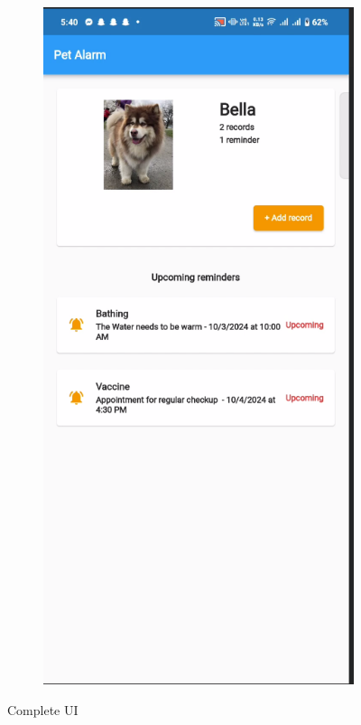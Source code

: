 \begin{figure}[H]
\begin{subfigure}{0.32\textwidth}
    \label{subfig:4}
  \end{subfigure}%
  \hfill
  \begin{subfigure}{0.32\textwidth}
    \includegraphics[width=\linewidth]{img/s1.png}
    \label{subfig:5}
  \end{subfigure}%
  \caption{Complete UI}
  \label{fig:UI}
\end{figure}